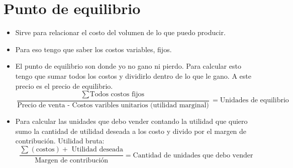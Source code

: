 \section{Punto de equilibrio}
\begin{itemize}
    \item Sirve para relacionar el costo del volumen de lo que puedo producir.
    \item Para eso tengo que saber los costos variables, fijos.
    \item El punto de equilibrio son donde yo no gano ni pierdo. Para calcular esto tengo que sumar todos los costos y dividirlo dentro de lo que le gano. A este precio es el precio de equilibrio.
        \[
          \frac{\sum_{}^{}\text{Todos costos fijos}}{\text{Precio de venta - Costos varibles unitarios (utilidad marginal)}} = \text{Unidades de equilibrio }
        \]
        
    \item Para calcular las unidades que debo vender contando la utilidad que quiero sumo la cantidad de utilidad deseada a los costo y divido por el margen de contribución. Utilidad bruta: 
        \[
        \frac{\sum_{}^{}(\text{costos}) + \text{ Utilidad deseada} }{\text{Margen de contribución}} = \text{Cantidad de unidades que debo vender}
        \]
    

\end{itemize}

